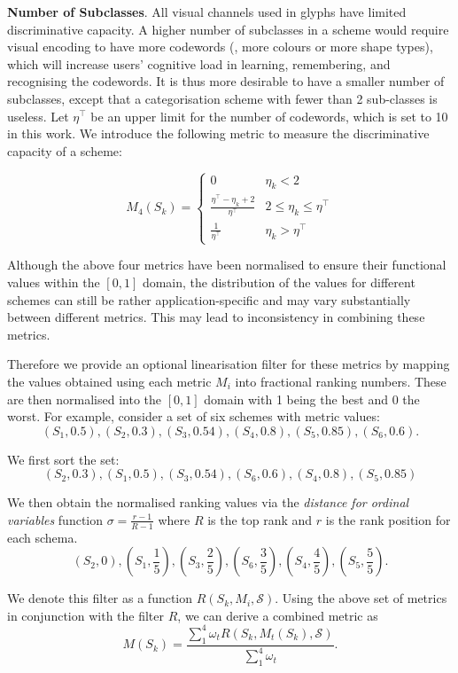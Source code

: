 \textbf{Number of Subclasses}.
All visual channels used in glyphs have limited discriminative capacity.
A higher number of subclasses in a scheme would require visual encoding to have more codewords (\eg, more colours or more shape types), which will increase users' cognitive load in learning, remembering, and recognising the codewords.
It is thus more desirable to have a smaller number of subclasses, except that a categorisation scheme with fewer than 2 sub-classes is useless.
Let $\eta^{\top}$ be an upper limit for the number of codewords, which is set to 10 in this work.
We introduce the following metric to measure the discriminative capacity of a scheme:

\begin{equation}
\label{eq:Branch}
  M_4(S_k) = \begin{cases}
    0 & \eta_k < 2 \\
    \frac{\eta^{\top}-\eta_k+2}{\eta^{\top}} & 2 \leq \eta_k \leq \eta^{\top} \\
    \frac{1}{\eta^{\top}} & \eta_k > \eta^{\top}
  \end{cases}
\end {equation}

Although the above four metrics have been normalised to ensure their functional values within the $[0, 1]$ domain, the distribution of the values for different schemes can still be rather application-specific and may vary substantially between different metrics. This may lead to inconsistency in combining these metrics.

Therefore we provide an optional linearisation filter for these metrics by mapping the values obtained using each metric $M_i$ into fractional ranking numbers.
These are then normalised into the $[0, 1]$ domain with 1 being the best and 0 the worst.
For example, consider a set of six schemes with metric values:
\[
  (S_1, 0.5), (S_2, 0.3), (S_3, 0.54), (S_4, 0.8), (S_5, 0.85), (S_6, 0.6).
\]

\noindent We first sort the set:
\[
 (S_2, 0.3), (S_1, 0.5), (S_3, 0.54), (S_6, 0.6), (S_4, 0.8), (S_5, 0.85)
\]

\noindent We then obtain the normalised ranking values via the \emph{distance for ordinal variables} function $\sigma=\frac{r-1}{R-1}$ where $R$ is the top rank and $r$ is the rank position for each schema.
\[
  (S_2, 0), (S_1, \frac{1}{5}), (S_3, \frac{2}{5}), (S_6, \frac{3}{5}), (S_4, \frac{4}{5}), (S_5, \frac{5}{5}).
\]

We denote this filter as a function $R(S_k, M_i, \mathcal{S})$. Using the above set of metrics in conjunction with the filter $R$, we can derive a combined metric as
\[
  M(S_k) = \frac{\sum_1^4 \omega_t R(S_k, M_t(S_k), \mathcal{S})}{\sum_1^4 \omega_t}.
\]

